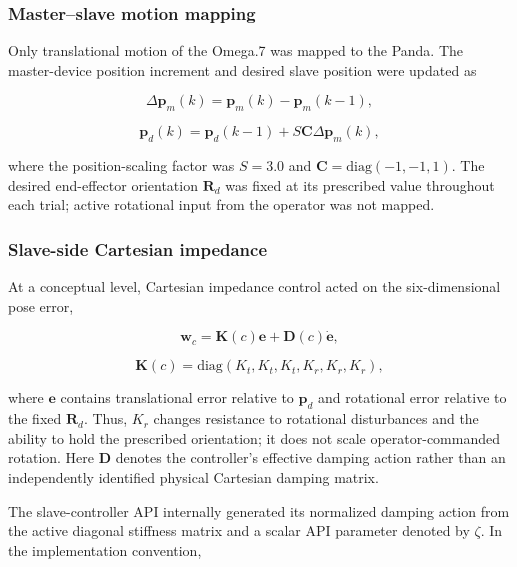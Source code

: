 \subsubsection{Master--slave motion mapping}
Only translational motion of the Omega.7 was mapped to the Panda. The master-device position increment and desired slave position were updated as

\begin{equation}
\label{eq:master-position-increment}
\Delta\mathbf{p}_m(k)=\mathbf{p}_m(k)-\mathbf{p}_m(k-1),
\end{equation}

\begin{equation}
\label{eq:desired-slave-position}
\mathbf{p}_d(k)=\mathbf{p}_d(k-1)+S\mathbf{C}\Delta\mathbf{p}_m(k),
\end{equation}

where the position-scaling factor was $S=3.0$ and $\mathbf{C}=\mathrm{diag}(-1,-1,1)$. The desired end-effector orientation $\mathbf{R}_d$ was fixed at its prescribed value throughout each trial; active rotational input from the operator was not mapped.

\subsubsection{Slave-side Cartesian impedance}
At a conceptual level, Cartesian impedance control acted on the six-dimensional pose error,

\begin{equation}
\label{eq:cartesian-impedance}
\mathbf{w}_c=\mathbf{K}(c)\mathbf{e}+\mathbf{D}(c)\dot{\mathbf{e}},
\end{equation}

\begin{equation}
\label{eq:stiffness-matrix}
\mathbf{K}(c)=\mathrm{diag}(K_t,K_t,K_t,K_r,K_r,K_r),
\end{equation}

where $\mathbf{e}$ contains translational error relative to $\mathbf{p}_d$ and rotational error relative to the fixed $\mathbf{R}_d$. Thus, $K_r$ changes resistance to rotational disturbances and the ability to hold the prescribed orientation; it does not scale operator-commanded rotation. Here $\mathbf{D}$ denotes the controller's effective damping action rather than an independently identified physical Cartesian damping matrix.

The slave-controller API internally generated its normalized damping action from the active diagonal stiffness matrix and a scalar API parameter denoted by $\zeta$. In the implementation convention,


